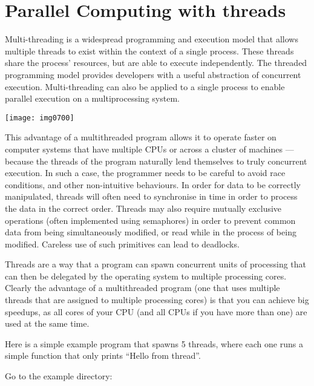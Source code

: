 \section{Parallel Computing with threads}

Multi-threading is a widespread programming and execution model that allows
multiple threads to exist within the context of a single process. These threads
share the process' resources, but are able to execute independently. The
threaded programming model provides developers with a useful abstraction of
concurrent execution. Multi-threading can also be applied to a single process
to enable parallel execution on a multiprocessing system.

\begin{center}
\texttt{[image: img0700]}
\end{center}

This advantage of a multithreaded program allows it to operate faster on
computer systems that have multiple CPUs or across a cluster of machines ---
because the threads of the program naturally lend themselves to truly
concurrent execution. In such a case, the programmer needs to be careful to
avoid race conditions, and other non-intuitive behaviours. In order for data to
be correctly manipulated, threads will often need to synchronise in time in
order to process the data in the correct order. Threads may also require
mutually exclusive operations (often implemented using semaphores) in order to
prevent common data from being simultaneously modified, or read while in the
process of being modified. Careless use of such primitives can lead to
deadlocks.

Threads are a way that a program can spawn concurrent units of processing that
can then be delegated by the operating system to multiple processing cores.
Clearly the advantage of a multithreaded program (one that uses multiple
threads that are assigned to multiple processing cores) is that you can achieve
big speedups, as all cores of your CPU (and all CPUs if you have more than one)
are used at the same time.

Here is a simple example program that spawns 5 threads, where each one runs a
simple function that only prints ``Hello from thread''.

Go to the example directory:

\begin{prompt}
\end{prompt}

